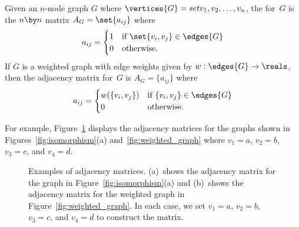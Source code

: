 \begin{definition}\label{def:adjacency_matrix}

Given an $n$-node graph $G$ where $\vertices{G} = set{ v_1, v_2, \dots,
v_n }$, the  for~$G$ is the $n \by n$ matrix
$A_G = \set{ a_{ij} }$ where
\begin{equation*}
    a_{ij} = \begin{cases}
                1 & \text{if $\set{ v_i, v_j } \in \edges{G}$} \\
                0 & \text{otherwise.}
              \end{cases}
\end{equation*}
If $G$ is a weighted graph with edge weights given by $w: \edges{G} \to
\reals$, then the adjacency matrix for~$G$ is $A_G = \{ a_{ij} \}$
where
\begin{equation*}
    a_{ij} = \begin{cases}
                w(\{ v_i, v_j \}) & \text{if $\{ v_i, v_j \} \in \edges{G}$} \\
                0                 & \text{otherwise.}
              \end{cases}
\end{equation*}
\end{definition}

For example, Figure~\ref{fig:adjacency_matrix} displays the adjacency
matrices for the graphs shown in Figures~\ref{fig:isomorphism}(a)
and~\ref{fig:weighted_graph} where $v_1 = a$, $v_2 = b$, $v_3 = c$,
and $v_4 = d$.

\begin{figure}
\normalbaselines
{}
\qquad
{}

\caption{Examples of adjacency matrices.  (a)~shows the adjacency
  matrix for the graph in Figure~\ref{fig:isomorphism}(a) and
  (b)~shows the adjacency matrix for the weighted graph in
  Figure~\ref{fig:weighted_graph}.  In each case, we  set $v_1
  = a$, $v_2 = b$, $v_3 = c$, and $v_4 = d$ to construct the matrix.}
\label{fig:adjacency_matrix}
\end{figure}

